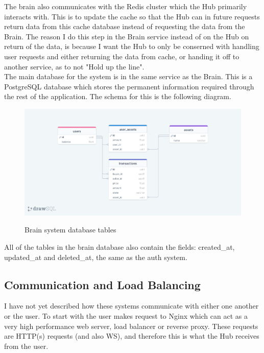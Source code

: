 \documentclass[titlepage]{article}
\begin{document}
The brain also communicates with the Redis cluster which the Hub primarily interacts with. This is to update the cache so that the Hub can in future requests return data from this cache database instead of requesting the data from the Brain. The reason I do this step in the Brain service instead of on the Hub on return of the data, is because I want the Hub to only be conserned with handling user requests and either returning the data from cache, or handing it off to another service, as to not "Hold up the line". \\

The main database for the system is in the same service as the Brain. This is a PostgreSQL database which stores the permanent information required through the rest of the application. The schema for this is the following diagram. \\


\begin{figure}
\includegraphics[width=\textwidth]{brain_diagram.png}
  \label{brain_tables}
  \caption{Brain system database tables}
\centering
\end{figure}

All of the tables in the brain database also contain the fields: created\_at, updated\_at and deleted\_at, the same as the auth system.

\subsection{Communication and Load Balancing}
I have not yet described how these systems communicate with either one another or the user. To start with the user makes request to Nginx which can act as a very high performance web server, load balancer or reverse proxy. These requests are HTTP(s) requests (and also WS), and therefore this is what the Hub receives from the user. \\
\end{document}
